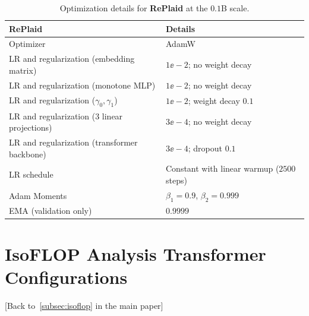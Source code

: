\documentclass{article}
\begin{document}
\begin{table}[h]
\centering
\caption{\small Optimization details for \textbf{RePlaid} at the $0.1$B scale.}
\vspace{0.5em}
\label{tab:replaid-dit-optimization-small}
%
\renewcommand{\arraystretch}{1}
%
\begin{tabular}{ll}
\toprule
\textbf{RePlaid} & \textbf{Details} \\
\midrule
Optimizer               & AdamW \\
LR and regularization (embedding matrix)   & $1\ee{-}2$; no weight decay \\
LR and regularization (monotone MLP) & $1\ee{-}2$; no weight decay\\
LR and regularization ($\gamma_0, \gamma_1$) & $1\ee{-}2$; weight decay $0.1$\\
LR and regularization (3 linear projections) & $3\ee{-}4$; no weight decay\\
LR and regularization (transformer backbone) & $3\ee{-}4$; dropout $0.1$ \\
LR schedule & Constant with linear warmup ($2500$ steps) \\
Adam Moments & $\beta_1=0.9$, $\beta_2=0.999$ \\
EMA (validation only) & $0.9999$ \\
\bottomrule
\end{tabular}
%
\end{table}

%

\clearpage



\section{IsoFLOP Analysis Transformer Configurations}
\label{supp:sec:transformer}
%

[Back to~\cref{subsec:isoflop} in the main paper]
\end{document}
